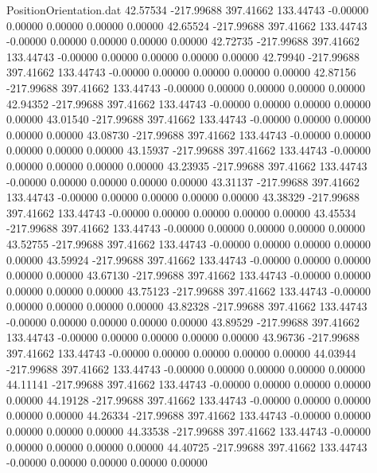 \begin{filecontents}{PositionOrientation.dat}
  42.57534 -217.99688  397.41662   133.44743   -0.00000    0.00000    0.00000    0.00000    0.00000
  42.65524 -217.99688  397.41662   133.44743   -0.00000    0.00000    0.00000    0.00000    0.00000
  42.72735 -217.99688  397.41662   133.44743   -0.00000    0.00000    0.00000    0.00000    0.00000
  42.79940 -217.99688  397.41662   133.44743   -0.00000    0.00000    0.00000    0.00000    0.00000
  42.87156 -217.99688  397.41662   133.44743   -0.00000    0.00000    0.00000    0.00000    0.00000
  42.94352 -217.99688  397.41662   133.44743   -0.00000    0.00000    0.00000    0.00000    0.00000
  43.01540 -217.99688  397.41662   133.44743   -0.00000    0.00000    0.00000    0.00000    0.00000
  43.08730 -217.99688  397.41662   133.44743   -0.00000    0.00000    0.00000    0.00000    0.00000
  43.15937 -217.99688  397.41662   133.44743   -0.00000    0.00000    0.00000    0.00000    0.00000
  43.23935 -217.99688  397.41662   133.44743   -0.00000    0.00000    0.00000    0.00000    0.00000
  43.31137 -217.99688  397.41662   133.44743   -0.00000    0.00000    0.00000    0.00000    0.00000
  43.38329 -217.99688  397.41662   133.44743   -0.00000    0.00000    0.00000    0.00000    0.00000
  43.45534 -217.99688  397.41662   133.44743   -0.00000    0.00000    0.00000    0.00000    0.00000
  43.52755 -217.99688  397.41662   133.44743   -0.00000    0.00000    0.00000    0.00000    0.00000
  43.59924 -217.99688  397.41662   133.44743   -0.00000    0.00000    0.00000    0.00000    0.00000
  43.67130 -217.99688  397.41662   133.44743   -0.00000    0.00000    0.00000    0.00000    0.00000
  43.75123 -217.99688  397.41662   133.44743   -0.00000    0.00000    0.00000    0.00000    0.00000
  43.82328 -217.99688  397.41662   133.44743   -0.00000    0.00000    0.00000    0.00000    0.00000
  43.89529 -217.99688  397.41662   133.44743   -0.00000    0.00000    0.00000    0.00000    0.00000
  43.96736 -217.99688  397.41662   133.44743   -0.00000    0.00000    0.00000    0.00000    0.00000
  44.03944 -217.99688  397.41662   133.44743   -0.00000    0.00000    0.00000    0.00000    0.00000
  44.11141 -217.99688  397.41662   133.44743   -0.00000    0.00000    0.00000    0.00000    0.00000
  44.19128 -217.99688  397.41662   133.44743   -0.00000    0.00000    0.00000    0.00000    0.00000
  44.26334 -217.99688  397.41662   133.44743   -0.00000    0.00000    0.00000    0.00000    0.00000
  44.33538 -217.99688  397.41662   133.44743   -0.00000    0.00000    0.00000    0.00000    0.00000
  44.40725 -217.99688  397.41662   133.44743   -0.00000    0.00000    0.00000    0.00000    0.00000

\end{filecontents}
